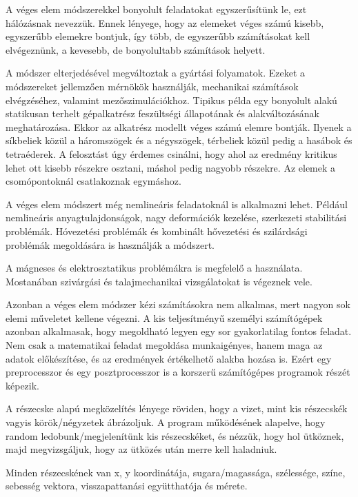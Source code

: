 \cite{veges1}
\cite{veges2}
\cite{wiki}

A véges elem módszerekkel
bonyolult feladatokat egyszerűsítünk le, ezt hálózásnak nevezzük. Ennek lényege, hogy az elemeket véges számú kisebb, egyszerűbb elemekre bontjuk, így több, de egyszerűbb számításokat kell elvégeznünk, a kevesebb, de bonyolultabb számítások helyett.


A módszer elterjedésével megváltoztak a gyártási folyamatok. Ezeket a módszereket jellemzően mérnökök használják, mechanikai számítások elvégzéséhez, valamint mezőszimulációkhoz. Tipikus példa egy bonyolult alakú statikusan terhelt gépalkatrész feszültségi állapotának és alakváltozásának meghatározása. Ekkor az alkatrész modellt véges számú elemre bontják. Ilyenek a síkbeliek közül a háromszögek és a négyszögek, térbeliek közül pedig a hasábok és tetraéderek. A felosztást úgy érdemes csinálni, hogy ahol az eredmény kritikus lehet ott kisebb részekre osztani, máshol pedig nagyobb részekre. Az elemek a csomópontoknál csatlakoznak egymáshoz. 


A véges elem módszert még nemlineáris feladatoknál is alkalmazni lehet. Például nemlineáris anyagtulajdonságok, nagy deformációk kezelése, szerkezeti stabilitási problémák. Hóvezetési problémák és kombinált hővezetési és szilárdsági problémák megoldására is használják a módszert. 


A mágneses és elektrosztatikus problémákra is megfelelő a használata. Mostanában szivárgási és talajmechanikai vizsgálatokat is végeznek vele. 

Azonban a véges elem módszer kézi számításokra nem alkalmas, mert nagyon sok elemi műveletet kellene végezni. A kis teljesítményű személyi számítógépek azonban alkalmasak, hogy megoldható legyen egy sor gyakorlatilag fontos feladat. Nem csak a matematikai feladat megoldása munkaigényes, hanem maga az adatok előkészítése, és az eredmények értékelhető alakba hozása is. Ezért egy preprocesszor és egy posztprocesszor is a korszerű számítógépes programok részét képezik.   






A részecske alapú megközelítés lényege röviden, hogy a vizet, mint kis részecskék vagyis körök/négyzetek ábrázoljuk. A program működésének alapelve, hogy random ledobunk/megjelenítünk kis részecskéket, és nézzük, hogy hol ütköznek, majd megvizsgáljuk, hogy az ütközés után merre kell haladniuk. 

Minden részecskének van x, y koordinátája, sugara/magassága, szélessége, színe, sebesség vektora, visszapattanási együtthatója és mérete. 

